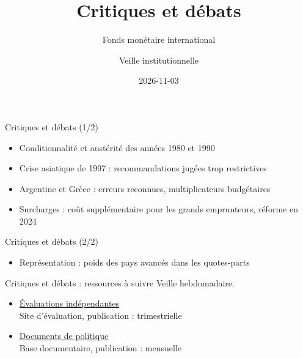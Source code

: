 \documentclass[aspectratio=169,11pt]{beamer}
\title{Critiques et débats}
\subtitle{Fonds monétaire international}
\author{Veille institutionnelle}
\date{2026-11-03}
\begin{document}
\begin{frame}\titlepage\end{frame}

\begin{frame}{Critiques et débats (1/2)}
\begin{itemize}
\item Conditionnalité et austérité des années 1980 et 1990
\item Crise asiatique de 1997 : recommandations jugées trop restrictives
\item Argentine et Grèce : erreurs reconnues, multiplicateurs budgétaires
\item Surcharges : coût supplémentaire pour les grands emprunteurs, réforme en 2024
\end{itemize}
\end{frame}

\begin{frame}{Critiques et débats (2/2)}
\begin{itemize}
\item Représentation : poids des pays avancés dans les quotes-parts
\end{itemize}
\end{frame}

\begin{frame}{Critiques et débats : ressources à suivre}
\small
Veille hebdomadaire.
\begin{itemize}
\item \href{https://ieo.imf.org}{Évaluations indépendantes}\\{\footnotesize Site d'évaluation, publication : trimestrielle}
\item \href{https://www.imf.org/en/Publications/Policy-Papers}{Documents de politique}\\{\footnotesize Base documentaire, publication : mensuelle}
\end{itemize}
\end{frame}
\end{document}
